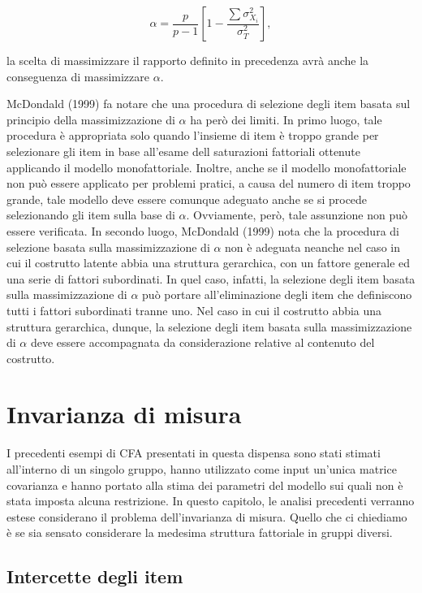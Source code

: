 \documentclass[
  11pt,
]{krantz}
\theoremstyle{definition}
\theoremstyle{definition}
\theoremstyle{definition}
\theoremstyle{definition}
\theoremstyle{remark}
\begin{document}
\[\alpha = \frac{p}{p-1}\left[1- \frac{\sum \sigma^2_{X_i}}{\sigma^2_T} \right],\]

la scelta di massimizzare il rapporto definito in precedenza avrà anche la conseguenza di massimizzare \(\alpha\).

McDondald (1999) fa notare che una procedura di selezione degli item basata sul principio della massimizzazione di \(\alpha\) ha però dei limiti. In primo luogo, tale procedura è appropriata solo quando l'insieme di item è troppo grande per selezionare gli item in base all'esame dell saturazioni fattoriali ottenute applicando il modello monofattoriale. Inoltre, anche se il modello monofattoriale non può essere applicato per problemi pratici, a causa del numero di item troppo grande, tale modello deve essere comunque adeguato anche se si procede selezionando gli item sulla base di \(\alpha\). Ovviamente, però, tale assunzione non può essere verificata. In secondo luogo, McDondald (1999) nota che la procedura di selezione basata sulla massimizzazione di \(\alpha\) non è adeguata neanche nel caso in cui il costrutto latente abbia una struttura gerarchica, con un fattore generale ed una serie di fattori subordinati. In quel caso, infatti, la selezione degli item basata sulla massimizzazione di \(\alpha\) può portare all'eliminazione degli item che definiscono tutti i fattori subordinati tranne uno. Nel caso in cui il costrutto abbia una struttura gerarchica, dunque, la selezione degli item basata sulla massimizzazione di \(\alpha\) deve essere accompagnata da considerazione relative al contenuto del costrutto.

\hypertarget{ch:factorial-invariance}{%
\chapter{Invarianza di misura}\label{ch:factorial-invariance}}

I precedenti esempi di CFA presentati in questa dispensa sono stati stimati all'interno di un singolo gruppo, hanno utilizzato come input un'unica matrice covarianza e hanno portato alla stima dei parametri del modello sui quali non è stata imposta alcuna restrizione. In questo capitolo, le analisi precedenti verranno estese considerano il problema dell'invarianza di misura. Quello che ci chiediamo è se sia sensato considerare la medesima struttura fattoriale in gruppi diversi.

\hypertarget{intercette-degli-item}{%
\section{Intercette degli item}\label{intercette-degli-item}}
\end{document}
